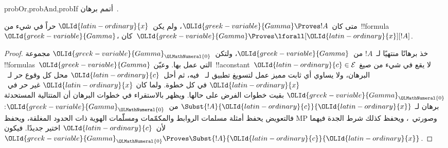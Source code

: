 \documentclass[../../../include/open-logic-section]{subfiles}
\begin{document}
\begin{probtag}{probOr,probAnd,probIf}
أتمم برهان~.
\end{probtag}

\begin{thm}[التعميم]
متى كان~${\OLId{greek-variable}{Gamma}} \Proves !A$، ولم يكن~${\OLId{latin-ordinary}{x}}$ حراً في شيء من~!!{formula}
${\OLId{greek-variable}{Gamma}}$، كان~${\OLId{greek-variable}{Gamma}} \Proves \lforall[{\OLId{latin-ordinary}{x}}][!A]$.
\end{thm}

\begin{proof}
خذ برهانًا منتهيًا لـ~$!A$ من~${\OLId{greek-variable}{Gamma}}$، ولتكن~${\OLId{greek-variable}{Gamma}}_{\OLMathNumeral{0}}$ مجموعة
!!{formula}s~${\OLId{greek-variable}{Gamma}}$ التي عمل بها. وعيّن~!!a{constant}~${\OLId{latin-ordinary}{c}}\in\mathcal E$ لا يقع في
شيء من صيغ البرهان، ولا يساوي أي ثابت مميز عمل لتسويغ تطبيق لـ~\QR{} فيه،
ثم أحل~${\OLId{latin-ordinary}{c}}$ محل كل وقوع حر لـ~${\OLId{latin-ordinary}{x}}$ في كل خطوة. ولما كان
${\OLId{latin-ordinary}{x}}$ غير حر في~${\OLId{greek-variable}{Gamma}}_{\OLMathNumeral{0}}$ بقيت خطوات الفرض على حالها. ويظهر بالاستقراء في
خطوات البرهان أن المتتالية المستحدثة برهان لـ
$\Subst{!A}{{\OLId{latin-ordinary}{c}}}{{\OLId{latin-ordinary}{x}}}$ من~${\OLId{greek-variable}{Gamma}}_{\OLMathNumeral{0}}$: فالتعويض يحفظ أمثلة مسلمات الروابط
والمكمّمات ومسلّمات الهوية ذات الحدود المغلقة، ويحفظ MP وصورتي~\QR{}،
ويحفظ كذلك شرط الجدة فيهما لأن~${\OLId{latin-ordinary}{c}}$ اختير جديدًا. فيكون
${\OLId{greek-variable}{Gamma}}_{\OLMathNumeral{0}} \Proves \Subst{!A}{{\OLId{latin-ordinary}{c}}}{{\OLId{latin-ordinary}{x}}}$.


\end{proof}
\end{document}
